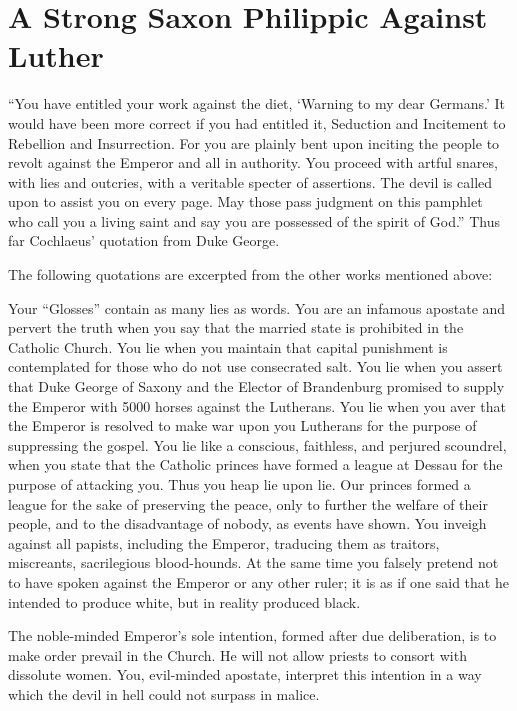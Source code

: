 \section{A Strong Saxon Philippic Against Luther}

“You have entitled your work against the diet, `Warning to my
dear Germans.' It would have been more correct if you had entitled
it, Seduction and Incitement to Rebellion and Insurrection. For you
are plainly bent upon inciting the people to revolt against the Emperor
and all in authority. You proceed with artful snares, with lies
and outcries, with a veritable specter of assertions. The devil is called
upon to assist you on every page. May those pass judgment on
this pamphlet who call you a living saint and say you are possessed
of the spirit of God.” Thus far Cochlaeus’ quotation from Duke
George.

The following quotations are excerpted from the other works mentioned
above:

Your “Glosses” contain as many lies as words. You are an infamous apostate
and pervert the truth when you say that the married state is prohibited
in the Catholic Church. You lie when you maintain that capital punishment
is contemplated for those who do not use consecrated salt. You lie when you
assert that Duke George of Saxony and the Elector of Brandenburg
promised to supply the Emperor with 5000 horses against the Lutherans. You
lie when you aver that the Emperor is resolved to make war upon
you Lutherans for the purpose of suppressing the gospel. You lie like a conscious,
faithless, and perjured scoundrel, when you state that the Catholic princes
have formed a league at Dessau for the purpose of attacking you. Thus you
heap lie upon lie. Our princes formed a league for the sake of preserving the
peace, only to further the welfare of their people, and to the disadvantage
of nobody, as events have shown. You inveigh against all papists, including
the Emperor, traducing them as traitors, miscreants, sacrilegious
blood-hounds. At the same time you falsely pretend not to have spoken
against the Emperor or any other ruler; it is as if one said that he intended
to produce white, but in reality produced black.

The noble-minded Emperor’s sole intention, formed after due deliberation,
is to make order prevail in the Church. He will not allow priests to consort
with dissolute women. You, evil-minded apostate, interpret this intention in
a way which the devil in hell could not surpass in malice.

